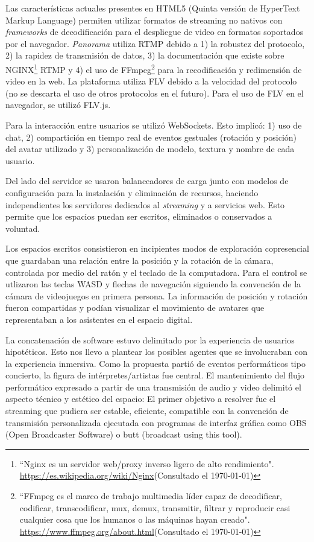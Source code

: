 Las características actuales presentes en HTML5 (Quinta versión de HyperText Markup Language) permiten utilizar formatos de streaming no nativos con \textit{frameworks} de decodificación para el despliegue de video en formatos soportados por el navegador. \textit{Panorama} utiliza RTMP debido a 1) la robustez del protocolo, 2) la rapidez de transmisión de datos, 3) la documentación que existe sobre NGINX\footnote{``Nginx es un servidor web/proxy inverso ligero de alto rendimiento". \url{https://es.wikipedia.org/wiki/Nginx}(Consultado el \today)} RTMP y 4) el uso de FFmpeg\footnote{``FFmpeg es el marco de trabajo multimedia líder capaz de decodificar, codificar, transcodificar, mux, demux, transmitir, filtrar y reproducir casi cualquier cosa que los humanos o las máquinas hayan creado". \url{https://www.ffmpeg.org/about.html}(Consultado el \today)} para la recodificación y redimensión de video en la web. La plataforma utiliza FLV debido a la velocidad del protocolo (no se descarta el uso de otros protocolos en el futuro). Para el uso de FLV en el navegador, se utilizó FLV.js. 

Para la interacción entre usuarios se utilizó WebSockets. Esto implicó: 1) uso de chat, 2) compartición en tiempo real de eventos gestuales (rotación y posición) del avatar utilizado y 3) personalización de modelo, textura y nombre de cada usuario. 

Del lado del servidor se usaron balanceadores de carga junto con modelos de configuración para la instalación y eliminación de recursos, haciendo independientes los servidores dedicados al \textit{streaming} y a servicios web. Esto permite que los espacios puedan ser escritos, eliminados o conservados a voluntad. 


Los espacios escritos consistieron en incipientes modos de exploración copresencial que guardaban una relación entre la posición y la rotación de la cámara, controlada por medio del ratón y el teclado de la computadora. Para el control se utlizaron las teclas WASD y flechas de navegación siguiendo la convención de la cámara de videojuegos en primera persona. La información de posición y rotación fueron compartidas y podían visualizar el movimiento de avatares que representaban a los asistentes en el espacio digital. 


La concatenación de software estuvo delimitado por la experiencia de usuarios hipotéticos. Esto nos llevo a plantear los posibles agentes que se involucraban con la experiencia inmersiva. Como la propuesta partió de eventos performáticos tipo concierto, la figura de intérpretes/artistas fue central. El mantenimiento del flujo performático expresado a partir de una transmisión de audio y video delimitó el aspecto técnico y estético del espacio: El primer objetivo a resolver fue el streaming que pudiera ser estable, eficiente, compatible con la convención de transmisión personalizada ejecutada con programas de interfaz gráfica como OBS (Open Broadcaster Software) o butt (broadcast using this tool).


